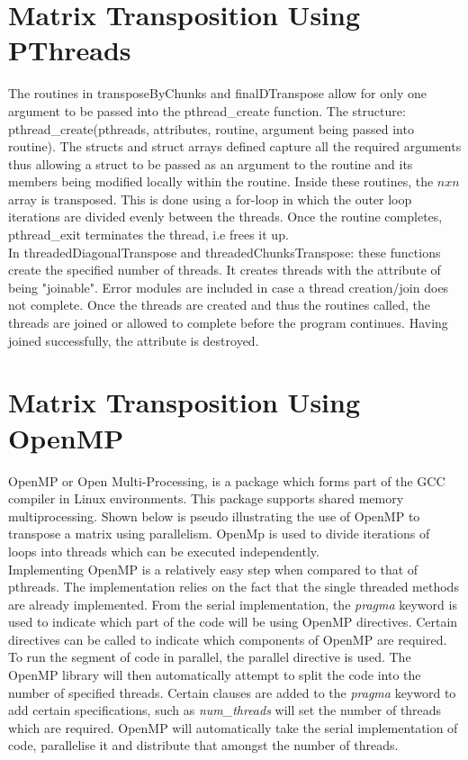 \documentclass[a4paper, 11pt, onecolumn, conference]{IEEEtran}      %
\begin{document}
\section{Matrix Transposition Using PThreads}

The routines in transposeByChunks and finalDTranspose allow for only one argument to be passed into the pthread\_create function. The structure: pthread\_create(pthreads, attributes, routine, argument being passed into routine). The structs and struct arrays defined capture all the required arguments thus allowing a struct to be passed as an argument to the routine and its members being modified locally within the routine. Inside these routines, the $nxn$ array is transposed. This is done using a for-loop in which the outer loop iterations are divided evenly between the threads. Once the routine completes, pthread\_exit terminates the thread, i.e frees it up.\\

In threadedDiagonalTranspose and threadedChunksTranspose: these functions create the specified number of threads. It creates threads with the attribute of being "joinable". Error modules are included in case a thread creation/join does not complete. Once the threads are created and thus the routines called, the threads are joined or allowed to complete before the program continues. Having joined successfully, the attribute is destroyed. 

\section{Matrix Transposition Using OpenMP}

OpenMP or Open Multi-Processing, is a package which forms part of the GCC compiler in Linux environments. This package supports shared memory multiprocessing\cite{utexas_getting_nodate}. Shown below is pseudo illustrating the use of OpenMP to transpose a matrix using parallelism. OpenMp is used to divide iterations of loops into threads which can be executed independently.\\

Implementing OpenMP is a relatively easy step when compared to that of pthreads. The implementation relies on the fact that the single threaded methods are already implemented. From the serial implementation, the \textit{pragma} keyword is used to indicate which part of the code will be using OpenMP directives\cite{utexas_getting_nodate}.  Certain directives can be called to indicate which components of OpenMP are required. To run the segment of code in parallel, the parallel directive is used. The OpenMP library will then automatically attempt to split the code into the number of specified threads\cite{utexas_getting_nodate}. Certain clauses are added to the \textit{pragma} keyword to add certain specifications, such as \textit{num\_threads} will set the number of threads which are required\cite{utexas_getting_nodate}. OpenMP will automatically take the serial implementation of code, parallelise it and distribute that amongst the number of threads\cite{utexas_getting_nodate}.\\
\end{document}
